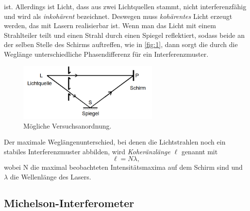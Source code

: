 ist. Allerdings ist Licht, dass aus zwei Lichtquellen stammt, nicht interferenzfähig und wird als \textit{inkohärent} bezeichnet. Deswegen muss \textit{kohärentes} Licht erzeugt werden, das mit Lasern realisierbar ist.
Wenn man das Licht mit einem Strahlteiler teilt und einen Strahl durch einen Spiegel reflektiert, sodass beide an der selben Stelle des Schirms auftreffen, wie in \autoref{fig:1}, dann sorgt die durch die Weglänge unterschiedliche Phasendifferenz für ein Interferenzmuster.
\begin{figure}[H]
  \centering
  \includegraphics[width=7cm]{content/1}
  \caption{Mögliche Versuchsanordnung. \cite{sample}}
  \label{fig:1}
\end{figure}
Der maximale Weglängenunterschied, bei denen die Lichtstrahlen noch ein stabiles Interferenzmuster abbilden, wird \textit{Koheränzlänge} $\ell$ genannt mit
\begin{equation}
  \ell=N\lambda, \nonumber
\end{equation}
wobei N die maximal beobachteten Intensitätsmaxima auf dem Schirm sind und $\lambda$ die Wellenlänge des Lasers.

\subsection{Michelson-Interferometer}

